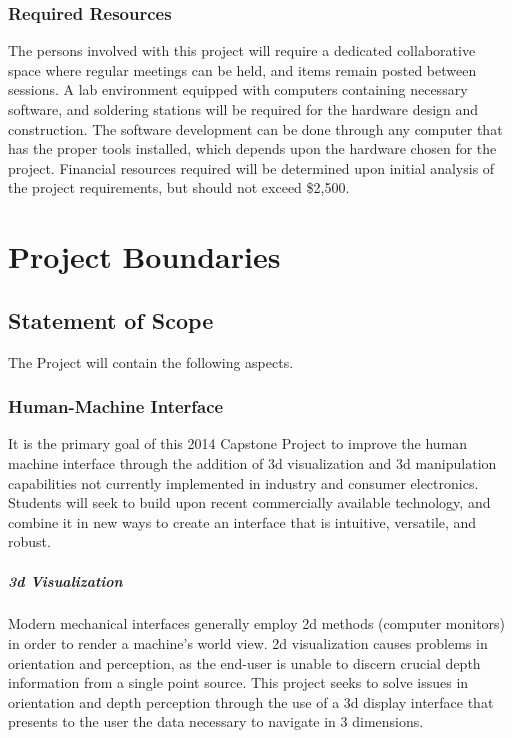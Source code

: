 \subsection{Required Resources}
The persons involved with this project will require a dedicated collaborative space where regular meetings can be held, and items remain posted between sessions.
A lab environment equipped with computers containing necessary software, and soldering stations will be required for the hardware design and construction.
The software development can be done through any computer that has the proper tools installed, which depends upon the hardware chosen for the project.
Financial resources required will be determined upon initial analysis of the project requirements, but should not exceed \$2,500.

\chapter{Project Boundaries}
\section{Statement of Scope}
The Project will contain the following aspects.

\subsection{Human-Machine Interface}
It is the primary goal of this 2014 Capstone Project to improve the human machine interface through the addition of \gls{3d} visualization and \gls{3d} manipulation capabilities not currently implemented in industry and consumer electronics.
Students will seek to build upon recent commercially available technology, and combine it in new ways to create an interface that is intuitive, versatile, and robust.

\paragraph{\gls{3d} Visualization}
Modern mechanical interfaces generally employ \gls{2d} methods (computer monitors) in order to render a machine's world view.
2d visualization causes problems in orientation and perception, as the end-user is unable to discern crucial depth information from a single point source.
This project seeks to solve issues in orientation and depth perception through the use of a \gls{3d} display interface that presents to the user the data necessary to navigate in 3 dimensions.

